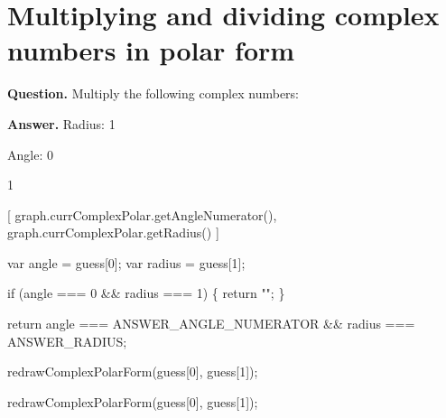 \documentclass{article}
\begin{document}
\section*{Multiplying and dividing complex numbers in polar form}
\textbf{Question.} Multiply the following complex numbers:

\textbf{Answer.} Radius: 1
                            
                                
                                
                            
                        
                        
                            Angle: 0
                            
                                
                                
                            
                        
                        1
                    
                    [
                        graph.currComplexPolar.getAngleNumerator(),
                        graph.currComplexPolar.getRadius()
                    ]
                    
                        var angle = guess[0];
                        var radius = guess[1];

                        if (angle === 0 \&\& radius === 1) \{
                            return "";
                        \}

                        return angle === ANSWER\_ANGLE\_NUMERATOR \&\&
                               radius === ANSWER\_RADIUS;
                    
                    
                        redrawComplexPolarForm(guess[0], guess[1]);
                    
                    
                        redrawComplexPolarForm(guess[0], guess[1]);
\end{document}
